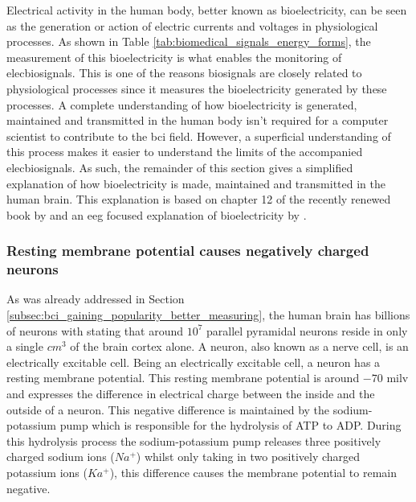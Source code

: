 Electrical activity in the human body, better known as bioelectricity, can be seen as the generation or action of electric currents and voltages in physiological processes.
As shown in Table \ref{tab:biomedical_signals_energy_forms}, the measurement of this bioelectricity is what enables the monitoring of \glspl{elecbiosignal}.
This is one of the reasons \glspl{biosignal} are closely related to physiological processes since it measures the bioelectricity generated by these processes.
A complete understanding of how bioelectricity is generated, maintained and transmitted in the human body isn't required for a computer scientist to contribute to the \gls{bci} field.
However, a superficial understanding of this process makes it easier to understand the limits of the accompanied \glspl{elecbiosignal}.
As such, the remainder of this section gives a simplified explanation of how bioelectricity is made, maintained and transmitted in the human brain.
This explanation is based on chapter 12 of the recently renewed book by \citet{bioelec_book} and an \gls{eeg} focused explanation of bioelectricity by \citet{eeg_bioelec_creation}.


\subsubsection{Resting membrane potential causes negatively charged neurons}
\label{subsubsec:biomedical_signals_biosignals_electrical_membrane_potential}

As was already addressed in Section \ref{subsec:bci_gaining_popularity_better_measuring}, the human brain has billions of neurons with \citet{neurons_book} stating that around $10^7$ parallel pyramidal neurons reside in only a single $cm^3$ of the brain cortex alone.
A neuron, also known as a nerve cell, is an electrically excitable cell.
Being an electrically excitable cell, a neuron has a resting membrane potential.
This resting membrane potential is around $-70$ \gls{milv} and expresses the difference in electrical charge between the inside and the outside of a neuron.
This negative difference is maintained by the sodium-potassium pump which is responsible for the hydrolysis of ATP to ADP.
During this hydrolysis process the sodium-potassium pump releases three positively charged sodium ions ($Na^+$) whilst only taking in two positively charged potassium ions ($Ka^+$), this difference causes the membrane potential to remain negative.



